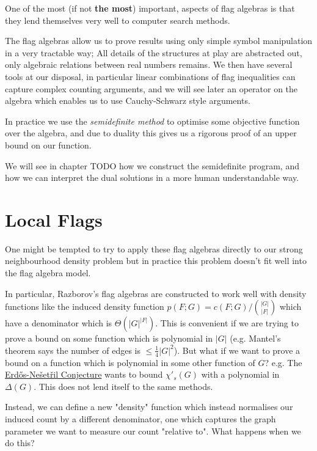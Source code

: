 One of the most (if not \textbf{the most}) important, aspects of flag algebras is that
they lend themselves very well to computer search methods.

The flag algebras allow us to prove results using only simple symbol manipulation in a very
tractable way; All details of the structures at play are abstracted out, only algebraic relations
between real numbers remains. We then have several tools at our disposal, in particular
linear combinations of flag inequalities can capture complex counting arguments, and
we will see later an operator on the algebra which enables us to use Cauchy-Schwarz style
arguments.

In practice we use the \textit{semidefinite method} to optimise some objective function
over the algebra, and due to duality this gives us a rigorous proof of an upper bound on our
function.

We will see in chapter TODO how we construct the semidefinite program, and how we can interpret
the dual solutions in a more human understandable way.

\section*{Local Flags}

One might be tempted to try to apply these flag algebras directly to our strong neighbourhood
density problem but in practice this problem doesn't fit well into the flag algebra model.

In particular, Razborov's flag algebras are constructed to work well with density functions
like the induced density function $p(F; G) = c(F; G)/\binom{|G|}{|F|}$ which have a
denominator which is $\Theta(|G|^{|F|})$. This is convenient if we are trying to prove
a bound on some function which is polynomial in $|G|$
(e.g. Mantel's theorem says the number of edges is $\leq \frac{1}{4}|G|^2$). But what if
we want to prove a bound on a function which is polynomial in some other function
of $G$? e.g. The \hyperref[conj:erdos-nesetril]{Erd\H{o}s-Nešetřil Conjecture}
wants to bound $\chi'_s(G)$ with a polynomial in $\Delta(G).$ This does not lend itself
to the same methods.

Instead, we can define a new "density" function which instead normalises our induced
count by a different denominator, one which captures the graph parameter we want to measure
our count "relative to". What happens when we do this?

